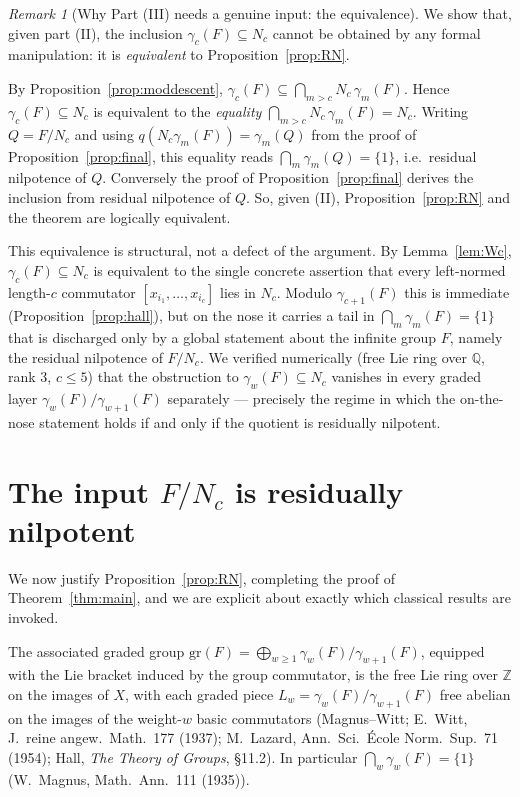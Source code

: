 \documentclass{amsart}
\theoremstyle{definition}
\theoremstyle{remark}
\newtheorem{remark}{Remark}
\begin{document}
\begin{remark}[Why Part (III) needs a genuine input: the equivalence]
\label{rem:gap}
We show that, given part (II), the inclusion $\gamma_c(F)\subseteq N_c$ cannot be
obtained by any formal manipulation: it is \emph{equivalent} to
Proposition~\ref{prop:RN}.

By Proposition~\ref{prop:moddescent}, $\gamma_c(F)\subseteq\bigcap_{m>c}
N_c\,\gamma_m(F)$. Hence $\gamma_c(F)\subseteq N_c$ is equivalent to the
\emph{equality} $\bigcap_{m>c}N_c\,\gamma_m(F)=N_c$. Writing $Q=F/N_c$ and using
$q(N_c\gamma_m(F))=\gamma_m(Q)$ from the proof of Proposition~\ref{prop:final},
this equality reads $\bigcap_{m}\gamma_m(Q)=\{1\}$, i.e.\ residual nilpotence of
$Q$. Conversely the proof of Proposition~\ref{prop:final} derives the inclusion
from residual nilpotence of $Q$. So, given (II), Proposition~\ref{prop:RN} and the
theorem are logically equivalent.

This equivalence is structural, not a defect of the argument. By
Lemma~\ref{lem:Wc}, $\gamma_c(F)\subseteq N_c$ is equivalent to the single
concrete assertion that every left-normed length-$c$ commutator
$[x_{i_1},\dots,x_{i_c}]$ lies in $N_c$. Modulo $\gamma_{c+1}(F)$ this is immediate
(Proposition~\ref{prop:hall}), but on the nose it carries a tail in
$\bigcap_m\gamma_m(F)=\{1\}$ that is discharged only by a global statement about
the infinite group $F$, namely the residual nilpotence of $F/N_c$. We verified
numerically (free Lie ring over $\mathbb{Q}$, rank $3$, $c\le 5$) that the
obstruction to $\gamma_w(F)\subseteq N_c$ vanishes in every graded layer
$\gamma_w(F)/\gamma_{w+1}(F)$ separately --- precisely the regime in which the
on-the-nose statement holds if and only if the quotient is residually nilpotent.
\end{remark}

\section{The input $F/N_c$ is residually nilpotent}\label{sec:RNdiscuss}

We now justify Proposition~\ref{prop:RN}, completing the proof of
Theorem~\ref{thm:main}, and we are explicit about exactly which classical results
are invoked.

The associated graded group
$\mathrm{gr}(F)=\bigoplus_{w\ge1}\gamma_w(F)/\gamma_{w+1}(F)$, equipped with the
Lie bracket induced by the group commutator, is the free Lie ring over
$\mathbb{Z}$ on the images of $X$, with each graded piece
$L_w=\gamma_w(F)/\gamma_{w+1}(F)$ free abelian on the images of the weight-$w$
basic commutators (Magnus--Witt; E.\ Witt, J.\ reine angew.\ Math.\ 177 (1937);
M.\ Lazard, Ann.\ Sci.\ \'Ecole Norm.\ Sup.\ 71 (1954); Hall, \emph{The Theory of
Groups}, \S11.2). In particular $\bigcap_{w}\gamma_w(F)=\{1\}$ (W.\ Magnus,
Math.\ Ann.\ 111 (1935)).
\end{document}
